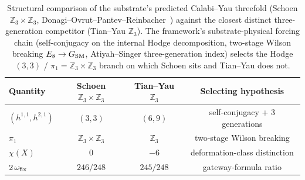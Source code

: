 \begin{table}[t]
\centering
\caption{Structural comparison of the substrate's predicted Calabi--Yau threefold (Schoen $\mathbb{Z}_3 \times \mathbb{Z}_3$, Donagi--Ovrut--Pantev--Reinbacher~\cite{BraunHeOvrutPantev2005}) against the closest distinct three-generation competitor (Tian--Yau $\mathbb{Z}_3$). The framework's substrate-physical forcing chain (self-conjugacy on the internal Hodge decomposition, two-stage Wilson breaking $E_8 \to G_{\rm SM}$, Atiyah--Singer three-generation index) selects the Hodge $(3,3)$ / $\pi_1 = \mathbb{Z}_3 \times \mathbb{Z}_3$ branch on which Schoen sits and Tian--Yau does not.}
\label{tab:cy3-substrate-identification}
\begin{ruledtabular}
\begin{tabular}{lccc}
Quantity & Schoen $\mathbb{Z}_3 \times \mathbb{Z}_3$ & Tian--Yau $\mathbb{Z}_3$ & Selecting hypothesis \\
\hline
$(h^{1,1}, h^{2,1})$ & $(3,3)$ & $(6,9)$ & self-conjugacy + 3 generations \\
$\pi_1$ & $\mathbb{Z}_3 \times \mathbb{Z}_3$ & $\mathbb{Z}_3$ & two-stage Wilson breaking \\
$\chi(X)$ & $0$ & $-6$ & deformation-class distinction \\
$2\,\omega_{\rm fix}$ & $246/248$ & $245/248$ & gateway-formula ratio \\
\end{tabular}
\end{ruledtabular}
\end{table}
